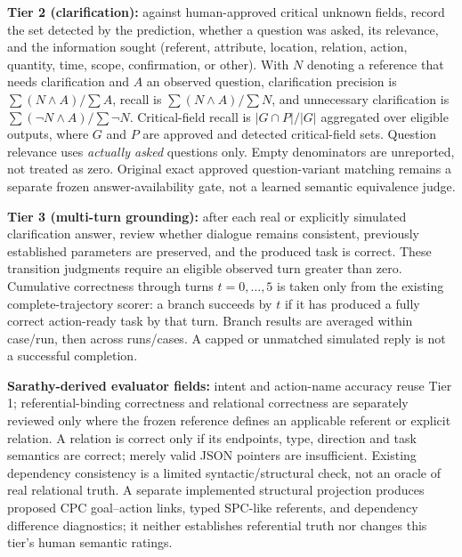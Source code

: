 \documentclass[10pt,conference]{IEEEtran}
\begin{document}
\textbf{Tier 2 (clarification):} against human-approved critical unknown fields, record the set detected by the prediction, whether a question was asked, its relevance, and the information sought (referent, attribute, location, relation, action, quantity, time, scope, confirmation, or other). With $N$ denoting a reference that needs clarification and $A$ an observed question, clarification precision is $\sum(N\land A)/\sum A$, recall is $\sum(N\land A)/\sum N$, and unnecessary clarification is $\sum(\neg N\land A)/\sum\neg N$. Critical-field recall is $|G\cap P|/|G|$ aggregated over eligible outputs, where $G$ and $P$ are approved and detected critical-field sets. Question relevance uses \emph{actually asked} questions only. Empty denominators are unreported, not treated as zero. Original exact approved question-variant matching remains a separate frozen answer-availability gate, not a learned semantic equivalence judge.

\textbf{Tier 3 (multi-turn grounding):} after each real or explicitly simulated clarification answer, review whether dialogue remains consistent, previously established parameters are preserved, and the produced task is correct. These transition judgments require an eligible observed turn greater than zero. Cumulative correctness through turns $t=0,\ldots,5$ is taken only from the existing complete-trajectory scorer: a branch succeeds by $t$ if it has produced a fully correct action-ready task by that turn. Branch results are averaged within case/run, then across runs/cases. A capped or unmatched simulated reply is not a successful completion.

\textbf{Sarathy-derived evaluator fields:} intent and action-name accuracy reuse Tier 1; referential-binding correctness and relational correctness are separately reviewed only where the frozen reference defines an applicable referent or explicit relation. A relation is correct only if its endpoints, type, direction and task semantics are correct; merely valid JSON pointers are insufficient. Existing dependency consistency is a limited syntactic/structural check, not an oracle of real relational truth. A separate implemented structural projection produces proposed CPC goal--action links, typed SPC-like referents, and dependency difference diagnostics; it neither establishes referential truth nor changes this tier's human semantic ratings.
\end{document}
